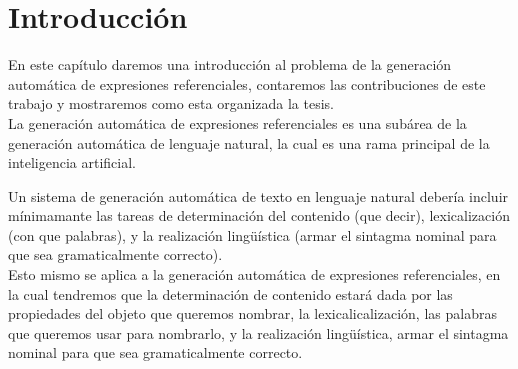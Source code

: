 \chapter{Introducci\'on}


En este cap\'itulo daremos una introducci\'on al problema de la generaci\'on autom\'atica de expresiones referenciales, contaremos las contribuciones de este trabajo y mostraremos como esta organizada la tesis.\\

La generaci\'on autom\'atica de expresiones referenciales es una sub\'area de la generaci\'on autom\'atica de lenguaje natural, la cual es una rama principal de la inteligencia artificial.

Un sistema de generaci\'on autom\'atica de texto en lenguaje natural deber\'ia incluir m\'inimamante 
las tareas de determinaci\'on del contenido (que decir), lexicalizaci\'on (con que palabras), y la realizaci\'on ling\"{u}\'istica (armar el  sintagma nominal para que sea gramaticalmente correcto). \\

Esto mismo se aplica a la generaci\'on autom\'atica de expresiones referenciales, en la cual tendremos que la determinaci\'on de contenido estar\'a dada por las propiedades del objeto que queremos nombrar, la lexicalicalizaci\'on, las palabras que queremos usar para nombrarlo, y la realizaci\'on ling\"u\'istica, armar el sintagma nominal para que sea gramaticalmente correcto.\\

 




